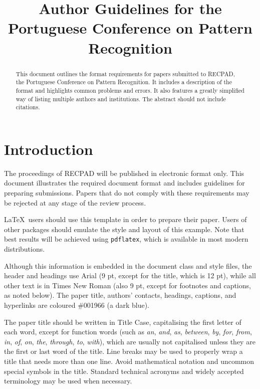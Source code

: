 \documentclass[extendedabs]{recpad2k}
\title{Author Guidelines for the Portuguese Conference on Pattern Recognition}
\begin{document}
\maketitle

\begin{abstract}
This document outlines the format requirements for papers submitted to RECPAD, the Portuguese Conference on Pattern Recognition. It includes a description of the format and highlights common problems and errors. It also features a greatly simplified way of listing multiple authors and institutions. The abstract should not include citations.
\end{abstract}

\section{Introduction}
\label{sec:intro}
The proceedings of RECPAD will be published in electronic format only. This document illustrates the required document format and includes guidelines for preparing submissions. Papers that do not comply with these requirements may be rejected at any stage of the review process.

\LaTeX\ users should use this template in order to prepare their paper. Users of other packages should emulate the style and layout of this example.  Note that best results will be achieved using {\tt pdflatex}, which is available in most modern distributions.

Although this information is embedded in the document class and style files, the header and headings use Arial (9 pt, except for the title, which is 12 pt), while all other text is in Times New Roman (also 9 pt, except for footnotes and captions, as noted below). The paper title, authors' contacts, headings, captions, and hyperlinks are coloured \#001966 (a dark blue). 

The paper title should be written in Title Case, capitalising the first letter of each word, except for function words (such as \emph{an}, \emph{and}, \emph{as}, \emph{between}, \emph{by}, \emph{for}, \emph{from}, \emph{in}, \emph{of}, \emph{on}, \emph{the}, \emph{through}, \emph{to}, \emph{with}), which are usually not capitalised unless they are the first or last word of the title. Line breaks may be used to properly wrap a title that needs more than one line. Avoid mathematical notation and uncommon special symbols in the title. Standard technical acronyms and widely accepted terminology may be used when necessary.
\end{document}
